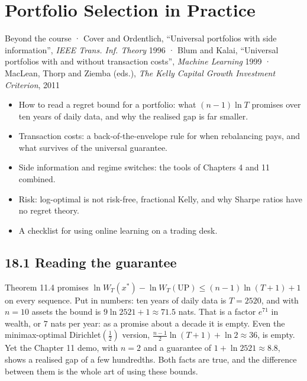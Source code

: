 \documentclass[11pt,a4paper,openany]{book}
\newcommand{\chapsource}[1]{{\small\sffamily\color{muted}#1\par}\medskip}
\begin{document}
\chapter[Portfolio selection in practice]{Portfolio Selection in Practice}\label{ch18}
\chapsource{Beyond the course · Cover and Ordentlich, ``Universal portfolios with side information'', \emph{IEEE Trans. Inf. Theory} 1996 · Blum and Kalai, ``Universal portfolios with and without transaction costs'', \emph{Machine Learning} 1999 · MacLean, Thorp and Ziemba (eds.), \emph{The Kelly Capital Growth Investment Criterion}, 2011}

\begin{goals}
\begin{itemize}
\item How to read a regret bound for a portfolio: what $(n-1)\ln T$ promises over ten years of daily data, and why the realised gap is far smaller.
\item Transaction costs: a back-of-the-envelope rule for when rebalancing pays, and what survives of the universal guarantee.
\item Side information and regime switches: the tools of Chapters 4 and 11 combined.
\item Risk: log-optimal is not risk-free, fractional Kelly, and why Sharpe ratios have no regret theory.
\item A checklist for using online learning on a trading desk.
\end{itemize}
\end{goals}

\section*{18.1 Reading the guarantee}\label{ch18-reading}

Theorem 11.4 promises $\ln W_T(x^*)-\ln W_T(\mathrm{UP})\le(n-1)\ln(T+1)+1$ on every sequence. Put in numbers: ten years of daily data is $T=2520$, and with $n=10$ assets the bound is $9\ln2521+1\approx71.5$ nats. That is a factor $e^{71}$ in wealth, or $7$ nats per year: as a promise about a decade it is empty. Even the minimax-optimal Dirichlet$(\tfrac12)$ version, $\frac{n-1}2\ln(T+1)+\ln2\approx36$, is empty. Yet the Chapter 11 demo, with $n=2$ and a guarantee of $1+\ln2521\approx8.8$, shows a realised gap of a few hundredths. Both facts are true, and the difference between them is the whole art of using these bounds.
\end{document}
